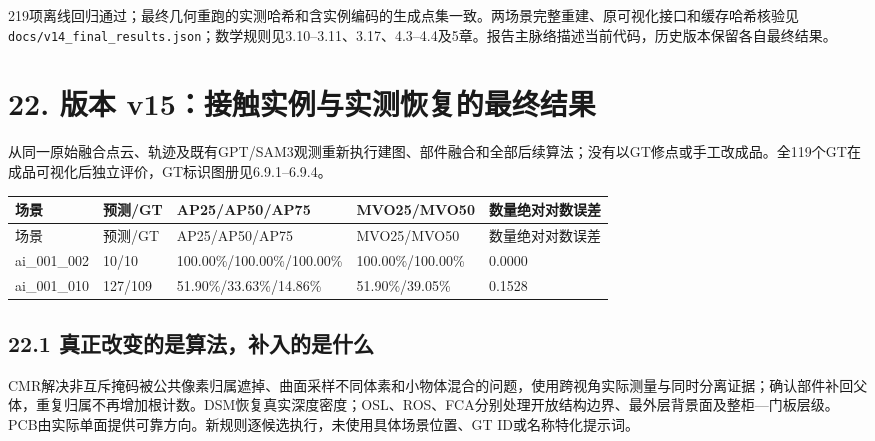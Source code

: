 \documentclass[UTF8,fontset=fandol]{ctexart}
\begin{document}
219项离线回归通过；最终几何重跑的实测哈希和含实例编码的生成点集一致。两场景完整重建、原可视化接口和缓存哈希核验见\texttt{docs/\allowbreak{}v14\_\allowbreak{}final\_\allowbreak{}results.\allowbreak{}json}；数学规则见3.10–3.11、3.17、4.3–4.4及5章。报告主脉络描述当前代码，历史版本保留各自最终结果。



\section*{22. 版本 v15：接触实例与实测恢复的最终结果}

从同一原始融合点云、轨迹及既有GPT/SAM3观测重新执行建图、部件融合和全部后续算法；没有以GT修点或手工改成品。全119个GT在成品可视化后独立评价，GT标识图册见6.9.1–6.9.4。



{\small
\begin{longtable}{|p{}|p{}|p{}|p{}|p{}|}
\hline
场景 & 预测/GT & AP25/AP50/AP75 & MVO25/MVO50 & 数量绝对对数误差 \\ \hline
\endfirsthead
\hline
场景 & 预测/GT & AP25/AP50/AP75 & MVO25/MVO50 & 数量绝对对数误差 \\ \hline
\endhead
ai\_001\_002 & 10/10 & 100.00\%/100.00\%/100.00\% & 100.00\%/100.00\% & 0.0000 \\ \hline
ai\_001\_010 & 127/109 & 51.90\%/33.63\%/14.86\% & 51.90\%/39.05\% & 0.1528 \\ \hline
\end{longtable}
}

\subsection*{22.1 真正改变的是算法，补入的是什么}

CMR解决非互斥掩码被公共像素归属遮掉、曲面采样不同体素和小物体混合的问题，使用跨视角实际测量与同时分离证据；确认部件补回父体，重复归属不再增加根计数。DSM恢复真实深度密度；OSL、ROS、FCA分别处理开放结构边界、最外层背景面及整柜—门板层级。PCB由实际单面提供可靠方向。新规则逐候选执行，未使用具体场景位置、GT ID或名称特化提示词。
\end{document}
